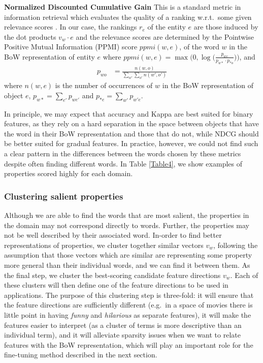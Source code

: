 \documentclass{article}
\begin{document}
\noindent \textbf{Normalized Discounted Cumulative Gain}
This is a standard metric in information retrieval which evaluates the quality of a ranking w.r.t.\ some given relevance scores \cite{jarvelin2002cumulated}.  In our case, the rankings $r_e$ of the entity $e$ are those induced by the dot products $v_w \cdot e$ and the relevance scores are determined by the Pointwise Positive Mutual Information (PPMI) score $\textit{ppmi}(w,e)$, of the word $w$ in the BoW representation of entity $e$ where
$\textit{ppmi}(w,e) = \max \big(0, \log\big(\frac{p_{we}}{p_{w*} \cdotp p_{*o}}\big)\big)$, and
\begin{align*}
p_{wo} &= \frac{n(w, o)}{\sum_{w'} \sum_{o'} n(w', o')}
\end{align*}
where $n(w,e)$ is the number of occurrences of $w$ in the BoW representation of object $e$, $p_{w*} = \sum_{e'} p_{we'}$ and $p_{*e} = \sum_{w'} p_{w'e}$. %
\smallskip

In principle, we may expect that accuracy and Kappa are best suited for binary features, as they rely on a hard separation in the space between objects that have the word in their BoW representation and those that do not, while NDCG should be better suited for gradual features. In practice, however, we could not find such a clear pattern in the differences between the words chosen by these metrics despite often finding different words. In Table \ref{Table4}, we show examples of properties scored highly for each domain.

\subsubsection{Clustering salient properties}
Although we are able to find the words that are most salient, the properties in the domain may not correspond directly to words. Further, the properties may not be well described by their associated word. In-order to find better representations of properties, we cluster together similar vectors $v_w$, following the assumption that those vectors which are similar are representing some property more general than their individual words, and we can find it between them.
As the final step, we cluster the best-scoring candidate feature directions $v_w$. Each of these clusters will then define one of the feature directions to be used in applications. The purpose of this clustering step is three-fold: it will ensure that the feature directions are sufficiently different (e.g.\ in a space of movies there is little point in having \emph{funny} and \emph{hilarious} as separate features), it will make the features easier to interpret (as a cluster of terms is more descriptive than an individual term), and it will alleviate sparsity issues when we want to relate features with the BoW representation, which will play an important role for the fine-tuning method described in the next section.
\end{document}
